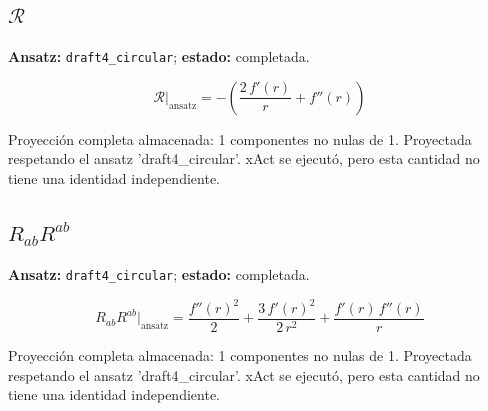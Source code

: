 \documentclass[11pt]{article}
\begin{document}
\subsection*{$ \mathcal{R} $}
\textbf{Ansatz:} \texttt{draft4\_circular}; \textbf{estado:} completada.\par
\begin{dmath*}[breakdepth={5}]
\mathcal{R}\big|_{\mathrm{ansatz}} = -\left(\frac{2\,f'\!\left(r\right)}{r} + f''\!\left(r\right)\right)
\end{dmath*}
\par\smallskip
Proyección completa almacenada: 1 componentes no nulas de 1. Proyectada respetando el ansatz 'draft4\_circular'. xAct se ejecutó, pero esta cantidad no tiene una identidad independiente.\par\medskip
{}
\subsection*{$ R_{ab}R^{ab} $}
\textbf{Ansatz:} \texttt{draft4\_circular}; \textbf{estado:} completada.\par
\begin{dmath*}[breakdepth={5}]
R_{ab}R^{ab}\big|_{\mathrm{ansatz}} = \frac{{f''\!\left(r\right)}^{2}}{2} + \frac{3\,{f'\!\left(r\right)}^{2}}{2\,{r}^{2}} + \frac{f'\!\left(r\right)\,f''\!\left(r\right)}{r}
\end{dmath*}
\par\smallskip
Proyección completa almacenada: 1 componentes no nulas de 1. Proyectada respetando el ansatz 'draft4\_circular'. xAct se ejecutó, pero esta cantidad no tiene una identidad independiente.\par\medskip
{}
\end{document}
